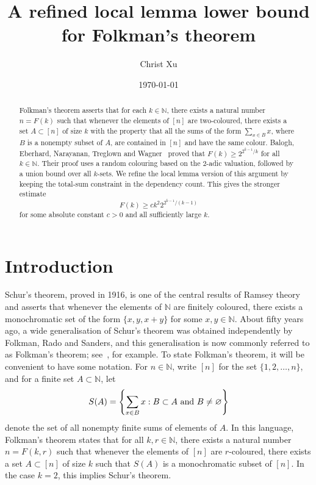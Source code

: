 \documentclass[12pt,a4paper,english,reqno]{amsart}
\theoremstyle{plain}
\theoremstyle{remark}
\newcommand{\N}{\mathbb{N}}
\let\emptyset\varnothing
\let\originalleft\left
\let\originalright\right
\renewcommand{\left}{\mathopen{}\mathclose\bgroup\originalleft}
\renewcommand{\right}{\aftergroup\egroup\originalright}
\begin{document}
\title{A refined local lemma lower bound for Folkman's theorem}

\author{Christ Xu}

\date{\today}


\begin{abstract}
Folkman's theorem asserts that for each $k \in \N$, there exists a natural number $n = F(k)$ such that whenever the elements of $[n]$ are two-coloured, there exists a set $A \subset [n]$ of size $k$ with the property that all the sums of the form $\sum_{x \in B} x$, where $B$ is a nonempty subset of $A$, are contained in $[n]$ and have the same colour. Balogh, Eberhard, Narayanan, Treglown and Wagner~\cite{BENTW} proved that $F(k) \ge 2^{2^{k-1}/k}$ for all $k \in \N$. Their proof uses a random colouring based on the $2$-adic valuation, followed by a union bound over all $k$-sets. We refine the local lemma version of this argument by keeping the total-sum constraint in the dependency count. This gives the stronger estimate
\[
F(k) \ge c k^2 2^{2^{k-1}/(k-1)}
\]
for some absolute constant $c>0$ and all sufficiently large $k$. 
\end{abstract}
\maketitle

\section{Introduction}\label{intro}

Schur's theorem, proved in 1916, is one of the central results of Ramsey theory and asserts that whenever the elements of $\N$ are finitely coloured, there exists a monochromatic set of the form $\{x, y, x+y\}$ for some $x, y \in \N$. About fifty years ago, a wide generalisation of Schur's theorem was obtained independently by Folkman, Rado and Sanders, and this generalisation is now commonly referred to as Folkman's theorem; see~\cite{graham}, for example. To state Folkman's theorem, it will be convenient to have some notation. For $n \in \N$, write $[n]$ for the set $\{1, 2, \dots, n\}$, and for a finite set $A \subset \N$, let
\[
S(A) = \left\{ \sum_{x \in B} x : B \subset A \text{ and } B \ne \emptyset \right\}
\]
denote the set of all nonempty finite sums of elements of $A$. In this language, Folkman's theorem states that for all $k, r \in \N$, there exists a natural number $n = F(k,r)$ such that whenever the elements of $[n]$ are $r$-coloured, there exists a set $A \subset [n]$ of size $k$ such that $S(A)$ is a monochromatic subset of $[n]$. In the case $k=2$, this implies Schur's theorem.
\end{document}
